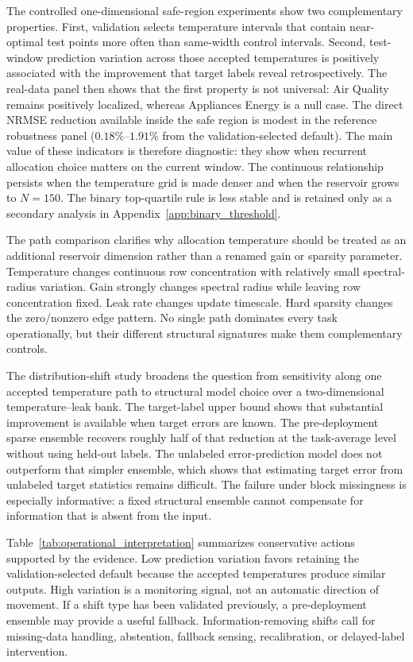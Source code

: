 \documentclass[11pt,a4paper]{article}
\begin{document}
The controlled one-dimensional safe-region experiments show two complementary properties. First, validation selects temperature intervals that contain near-optimal test points more often than same-width control intervals. Second, test-window prediction variation across those accepted temperatures is positively associated with the improvement that target labels reveal retrospectively. The real-data panel then shows that the first property is not universal: Air Quality remains positively localized, whereas Appliances Energy is a null case. The direct NRMSE reduction available inside the safe region is modest in the reference robustness panel ($0.18\%$--$1.91\%$ from the validation-selected default). The main value of these indicators is therefore diagnostic: they show when recurrent allocation choice matters on the current window. The continuous relationship persists when the temperature grid is made denser and when the reservoir grows to $N=150$. The binary top-quartile rule is less stable and is retained only as a secondary analysis in Appendix~\ref{app:binary_threshold}.

The path comparison clarifies why allocation temperature should be treated as an additional reservoir dimension rather than a renamed gain or sparsity parameter. Temperature changes continuous row concentration with relatively small spectral-radius variation. Gain strongly changes spectral radius while leaving row concentration fixed. Leak rate changes update timescale. Hard sparsity changes the zero/nonzero edge pattern. No single path dominates every task operationally, but their different structural signatures make them complementary controls.

The distribution-shift study broadens the question from sensitivity along one accepted temperature path to structural model choice over a two-dimensional temperature--leak bank. The target-label upper bound shows that substantial improvement is available when target errors are known. The pre-deployment sparse ensemble recovers roughly half of that reduction at the task-average level without using held-out labels. The unlabeled error-prediction model does not outperform that simpler ensemble, which shows that estimating target error from unlabeled target statistics remains difficult. The failure under block missingness is especially informative: a fixed structural ensemble cannot compensate for information that is absent from the input.

Table~\ref{tab:operational_interpretation} summarizes conservative actions supported by the evidence. Low prediction variation favors retaining the validation-selected default because the accepted temperatures produce similar outputs. High variation is a monitoring signal, not an automatic direction of movement. If a shift type has been validated previously, a pre-deployment ensemble may provide a useful fallback. Information-removing shifts call for missing-data handling, abstention, fallback sensing, recalibration, or delayed-label intervention.
\end{document}
